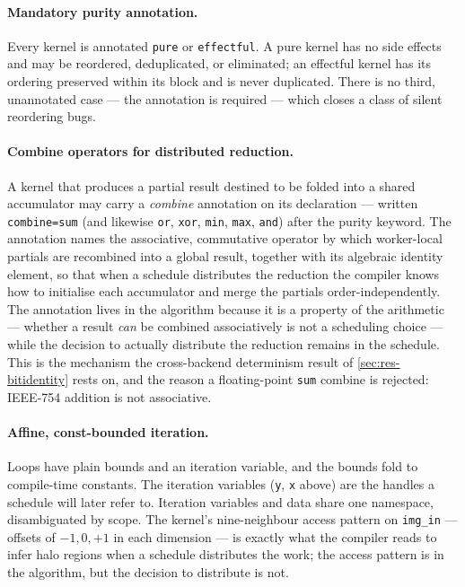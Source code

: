 \paragraph{Mandatory purity annotation.} Every kernel is annotated \texttt{pure}
or \texttt{effectful}. A pure kernel has no side effects and may be reordered,
deduplicated, or eliminated; an effectful kernel has its ordering preserved
within its block and is never duplicated. There is no third, unannotated case ---
the annotation is required --- which closes a class of silent reordering bugs.

\paragraph{Combine operators for distributed reduction.} A kernel that produces a
partial result destined to be folded into a shared accumulator may carry a
\emph{combine} annotation on its declaration --- written \texttt{combine=sum} (and
likewise \texttt{or}, \texttt{xor}, \texttt{min}, \texttt{max}, \texttt{and}) after
the purity keyword. The annotation names the associative, commutative operator by
which worker-local partials are recombined into a global result, together with its
algebraic identity element, so that when a schedule distributes the reduction the
compiler knows how to initialise each accumulator and merge the partials
order-independently. The annotation lives in the algorithm because it is a property
of the arithmetic --- whether a result \emph{can} be combined associatively is not
a scheduling choice --- while the decision to actually distribute the reduction
remains in the schedule. This is the mechanism the cross-backend determinism result
of \cref{sec:res-bitidentity} rests on, and the reason a floating-point
\texttt{sum} combine is rejected: IEEE-754 addition is not associative.

\paragraph{Affine, const-bounded iteration.} Loops have plain bounds and an
iteration variable, and the bounds fold to compile-time constants. The iteration
variables (\texttt{y}, \texttt{x} above) are the handles a schedule will later
refer to. Iteration variables and data share one namespace, disambiguated by
scope. The kernel's nine-neighbour access pattern on \texttt{img\_in} --- offsets
of $-1,0,+1$ in each dimension --- is exactly what the compiler reads to infer
halo regions when a schedule distributes the work; the access pattern is in the
algorithm, but the decision to distribute is not.

